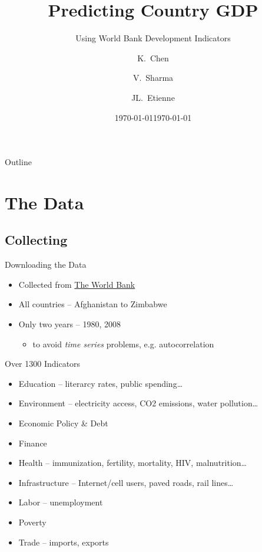 \documentclass{beamer}
\title{Predicting Country GDP}
\subtitle{Using World Bank Development Indicators}
\date{\today}
\author{K.~Chen\inst{1} \and V.~Sharma\inst{1} \and JL.~Etienne\inst{1}}
\institute[Williams College] 
{
  \inst{1}
  Statistics 202 \\
  Williams College
}
\date{\today}
\begin{document}
\begin{frame}
\titlepage
\end{frame}

\begin{frame}{Outline}
\tableofcontents
\end{frame}



\section{The Data}

\subsection{Collecting}

\begin{frame}{Downloading the Data}
\begin{itemize}
	\item Collected from \href{http://data.worldbank.org/indicator}{The World Bank} 
	\item All countries -- Afghanistan to Zimbabwe
	\item Only two years -- 1980, 2008
		\begin{itemize}
			\item to avoid \emph{time series} problems, e.g. autocorrelation
		\end{itemize}
\end{itemize}
\end{frame}

\begin{frame}{Over 1300 Indicators}
\begin{itemize}
	\item Education -- literarcy rates, public spending\dots
	\item Environment -- electricity access, CO2 emissions, water pollution\dots
	\item Economic Policy \& Debt
	\item Finance
	\item Health -- immunization, fertility, mortality, HIV, malnutrition\dots
	\item Infrastructure -- Internet/cell users, paved roads, rail lines\dots
	\item Labor -- unemployment
	\item Poverty
	\item Trade -- imports, exports
\end{itemize}
\end{frame}
\end{document}
